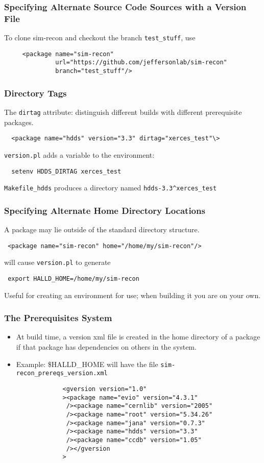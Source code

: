 \documentclass{beamer}
\newcommand{\bi}{\begin{itemize}}
\newcommand{\ei}{\end{itemize}}
\newcommand{\I}{\item}
\begin{document}
\begin{frame}[fragile]
  \frametitle{Specifying Alternate Source Code Sources with a Version File}
To clone sim-recon and checkout the branch {\tt test\_stuff}, use
\begin{verbatim}
     <package name="sim-recon"
              url="https://github.com/jeffersonlab/sim-recon"
              branch="test_stuff"/>
\end{verbatim}

\end{frame}
\begin{frame}[fragile]
  \frametitle{Directory Tags}\label{section:directory-tags}

The {\tt dirtag} attribute: distinguish different builds with different prerequisite packages.
\begin{verbatim}
  <package name="hdds" version="3.3" dirtag="xerces_test"\>
\end{verbatim}
{\tt version.pl} adds a variable to the environment:
\begin{verbatim}
  setenv HDDS_DIRTAG xerces_test
\end{verbatim}
{\tt Makefile\_hdds} produces a directory named {\tt hdds-3.3\^{}xerces\_test}

\end{frame}
\begin{frame}
  \frametitle{Specifying Alternate Home Directory Locations}

A package may lie outside of the standard directory structure.
\begin{center} \tt
<package name="sim-recon" home="/home/my/sim-recon"/>
\end{center}
will cause {\tt version.pl} to generate
\begin{center} \tt
export HALLD\_HOME=/home/my/sim-recon
\end{center}
Useful for creating an environment for use; when building it you are on your own.

\end{frame}

\begin{frame}[fragile]
  \frametitle{The Prerequisites System}\label{section:prerequisites-system}
\bi
\I At build time, a version xml file is created in the home directory of
a package if that package has dependencies on others in the
system.
\I Example: \$HALLD\_HOME will have the file {\tt sim-recon\_prereqs\_version.xml}
\ei
\begin{verbatim}
                <gversion version="1.0"
                ><package name="evio" version="4.3.1"
                 /><package name="cernlib" version="2005"
                 /><package name="root" version="5.34.26"
                 /><package name="jana" version="0.7.3"
                 /><package name="hdds" version="3.3"
                 /><package name="ccdb" version="1.05"
                 /></gversion
                >
\end{verbatim}
\end{frame}
\end{document}
